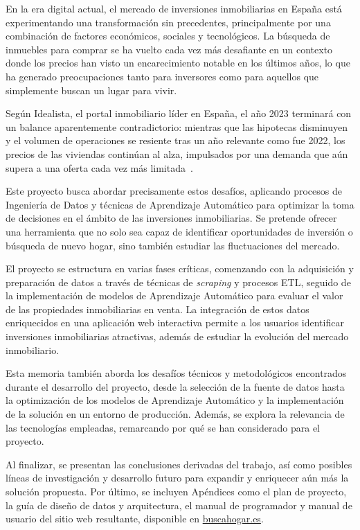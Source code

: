 
En la era digital actual, el mercado de inversiones inmobiliarias en España está experimentando una transformación sin precedentes, principalmente por una combinación de factores económicos, sociales y tecnológicos. La búsqueda de inmuebles para comprar se ha vuelto cada vez más desafiante en un contexto donde los precios han visto un encarecimiento notable en los últimos años, lo que ha generado preocupaciones tanto para inversores como para aquellos que simplemente buscan un lugar para vivir. 

Según Idealista, el portal inmobiliario líder en España, el año 2023 terminará con un balance aparentemente contradictorio: mientras que las hipotecas disminuyen y el volumen de operaciones se resiente tras un año relevante como fue 2022, los precios de las viviendas continúan al alza, impulsados por una demanda que aún supera a una oferta cada vez más limitada~\cite{idealista_study}.

Este proyecto busca abordar precisamente estos desafíos, aplicando procesos de Ingeniería de Datos y técnicas de Aprendizaje Automático para optimizar la toma de decisiones en el ámbito de las inversiones inmobiliarias. Se pretende ofrecer una herramienta que no solo sea capaz de identificar oportunidades de inversión o búsqueda de nuevo hogar, sino también estudiar las fluctuaciones del mercado.

El proyecto se estructura en varias fases críticas, comenzando con la adquisición y preparación de datos a través de técnicas de \textit{scraping} y procesos ETL, seguido de la implementación de modelos de Aprendizaje Automático para evaluar el valor de las propiedades inmobiliarias en venta. La integración de estos datos enriquecidos en una aplicación web interactiva permite a los usuarios identificar inversiones inmobiliarias atractivas, además de estudiar la evolución del mercado inmobiliario.

Esta memoria también aborda los desafíos técnicos y metodológicos encontrados durante el desarrollo del proyecto, desde la selección de la fuente de datos hasta la optimización de los modelos de Aprendizaje Automático y la implementación de la solución en un entorno de producción. Además, se explora la relevancia de las tecnologías empleadas, remarcando por qué se han considerado para el proyecto.

Al finalizar, se presentan las conclusiones derivadas del trabajo, así como posibles líneas de investigación y desarrollo futuro para expandir y enriquecer aún más la solución propuesta. Por último, se incluyen Apéndices como el plan de proyecto, la guía de diseño de datos y arquitectura, el manual de programador y manual de usuario del sitio web resultante, disponible en \href{https://www.buscahogar.es}{buscahogar.es}.